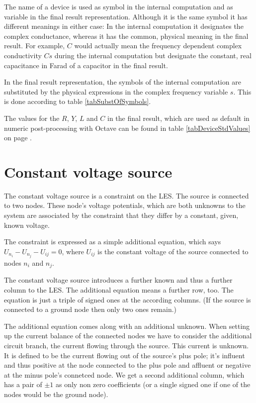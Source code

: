 The name of a device is used as symbol in the internal computation and as
variable in the final result representation. Although it is the same
symbol it has different meanings in either case: In the internal
computation it designates the complex conductance, whereas it has the
common, physical meaning in the final result. For example, $C$ would
actually mean the frequency dependent complex conductivity $Cs$ during the
internal computation but designate the constant, real capacitance in Farad
of a capacitor in the final result.

In the final result representation, the symbols of the internal
computation are substituted by the physical expressions in the complex
frequency variable $s$. This is done according to table
\ref{tabSubstOfSymbols}.

The values for the $R$, $Y$, $L$ and $C$ in the final result, which are
used as default in numeric post-processing with Octave can be found in
table \ref{tabDeviceStdValues} on page \pageref{tabDeviceStdValues}.


\section{Constant voltage source}
\label{secModellingDevs_ConstVoltSrc}

The constant voltage source is a constraint on the LES. The source is
connected to two nodes. These node's voltage potentials, which are both
unknowns to the system are associated by the constraint that they differ
by a constant, given, known voltage.

The constraint is expressed as a simple additional equation, which says
$U_{n_i} - U_{n_j} - U_{ij} = 0$, where $U_{ij}$ is the constant voltage
of the source connected to nodes $n_i$ and $n_j$.

The constant voltage source introduces a further known and thus a further
column to the LES. The additional equation means a further row, too. The
equation is just a triple of signed ones at the according columns. (If the
source is connected to a ground node then only two ones remain.)

The additional equation comes along with an additional unknown. When
setting up the current balance of the connected nodes we have to consider
the additional circuit branch, the current flowing through the source.
This current is unknown. It is defined to be the current flowing out of
the source's plus pole; it's influent and thus positive at the node
connected to the plus pole and affluent or negative at the minus pole's
connetced node. We get a second additional column, which has a pair of
$\pm 1$ as only non zero coefficients (or a single signed one if one of
the nodes would be the ground node).

